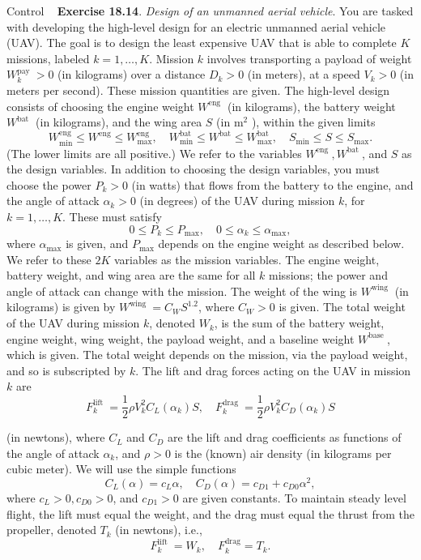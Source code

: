 \begin{chapter}{Control}
    \vspace{0.2cm}
    \noindent~\cite{EE364a-extra} \textbf{Exercise 18.14}. \textit{Design of an unmanned aerial vehicle}.
    You are tasked with developing the high-level design for an electric unmanned aerial vehicle (UAV). The goal is to design the least expensive UAV that is able to complete $K$ missions, labeled $k=1, \ldots, K$. Mission $k$ involves transporting a payload of weight $W_k^{\text {pay }}>0$ (in kilograms) over a distance $D_k>0$ (in meters), at a speed $V_k>0$ (in meters per second). These mission quantities are given.
    The high-level design consists of choosing the engine weight $W^{\text {eng }}$ (in kilograms), the battery weight $W^{\text {bat }}$ (in kilograms), and the wing area $S$ (in $\mathrm{m}^2$ ), within the given limits
    \[
    W_{\min }^{\mathrm{eng}} \leq W^{\mathrm{eng}} \leq W_{\max }^{\mathrm{eng}}, \quad W_{\min }^{\mathrm{bat}} \leq W^{\mathrm{bat}} \leq W_{\max }^{\mathrm{bat}}, \quad S_{\min } \leq S \leq S_{\max } .
    \]
    (The lower limits are all positive.) We refer to the variables $W^{\text {eng }}, W^{\text {bat }}$, and $S$ as the design variables.
    In addition to choosing the design variables, you must choose the power $P_k>0$ (in watts) that flows from the battery to the engine, and the angle of attack $\alpha_k>0$ (in degrees) of the UAV during mission $k$, for $k=1, \ldots, K$. These must satisfy
    \[
    0 \leq P_k \leq P_{\max }, \quad 0 \leq \alpha_k \leq \alpha_{\max },
    \]
    where $\alpha_{\max }$ is given, and $P_{\max }$ depends on the engine weight as described below. We refer to these $2 K$ variables as the mission variables. The engine weight, battery weight, and wing area are the same for all $k$ missions; the power and angle of attack can change with the mission.
    The weight of the wing is $W^{\text {wing }}$ (in kilograms) is given by $W^{\text {wing }}=C_W S^{1.2}$, where $C_W>0$ is given. The total weight of the UAV during mission $k$, denoted $W_k$, is the sum of the battery weight, engine weight, wing weight, the payload weight, and a baseline weight $W^{\text {base }}$, which is given. The total weight depends on the mission, via the payload weight, and so is subscripted by $k$.
    The lift and drag forces acting on the UAV in mission $k$ are
    \[
    F_k^{\text {lift }}=\frac{1}{2} \rho V_k^2 C_L\left(\alpha_k\right) S, \quad F_k^{\text {drag }}=\frac{1}{2} \rho V_k^2 C_D\left(\alpha_k\right) S
    \]

    (in newtons), where $C_L$ and $C_D$ are the lift and drag coefficients as functions of the angle of attack $\alpha_k$, and $\rho>0$ is the (known) air density (in kilograms per cubic meter). We will use the simple functions
    \[
    C_L(\alpha)=c_L \alpha, \quad C_D(\alpha)=c_{D 1}+c_{D 0} \alpha^2,
    \]
    where $c_L>0, c_{D 0}>0$, and $c_{D 1}>0$ are given constants.
    To maintain steady level flight, the lift must equal the weight, and the drag must equal the thrust from the propeller, denoted $T_k$ (in newtons), i.e.,
    \[
    F_k^{\text {lift }}=W_k, \quad F_k^{\mathrm{drag}}=T_k .
    \]


\end{chapter}

